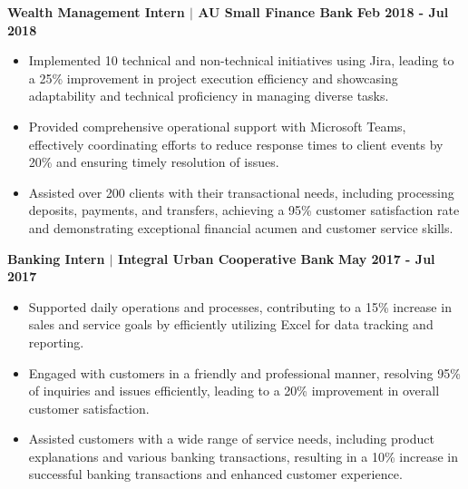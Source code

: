 \documentclass{article}
\begin{document}
\vspace{1mm}

\noindent \textbf{Wealth Management Intern $\mid$ AU Small Finance Bank} \hfill \textbf{Feb 2018 - Jul 2018}
\begin{itemize}[noitemsep,nolistsep,leftmargin=*]
    \item Implemented 10 technical and non-technical initiatives using Jira, leading to a 25\% improvement in project execution efficiency and showcasing adaptability and technical proficiency in managing diverse tasks.
    \item Provided comprehensive operational support with Microsoft Teams, effectively coordinating efforts to reduce response times to client events by 20\% and ensuring timely resolution of issues.
    \item Assisted over 200 clients with their transactional needs, including processing deposits, payments, and transfers, achieving a 95\% customer satisfaction rate and demonstrating exceptional financial acumen and customer service skills.
\end{itemize}

\vspace{1mm}

\noindent \textbf{Banking Intern $\mid$ Integral Urban Cooperative Bank} \hfill \textbf{May 2017 - Jul 2017}
\begin{itemize}[noitemsep,nolistsep,leftmargin=*]
    \item Supported daily operations and processes, contributing to a 15\% increase in sales and service goals by efficiently utilizing Excel for data tracking and reporting.
    \item Engaged with customers in a friendly and professional manner, resolving 95\% of inquiries and issues efficiently, leading to a 20\% improvement in overall customer satisfaction.
    \item Assisted customers with a wide range of service needs, including product explanations and various banking transactions, resulting in a 10\% increase in successful banking transactions and enhanced customer experience.
\end{itemize}
%
%
\end{document}
